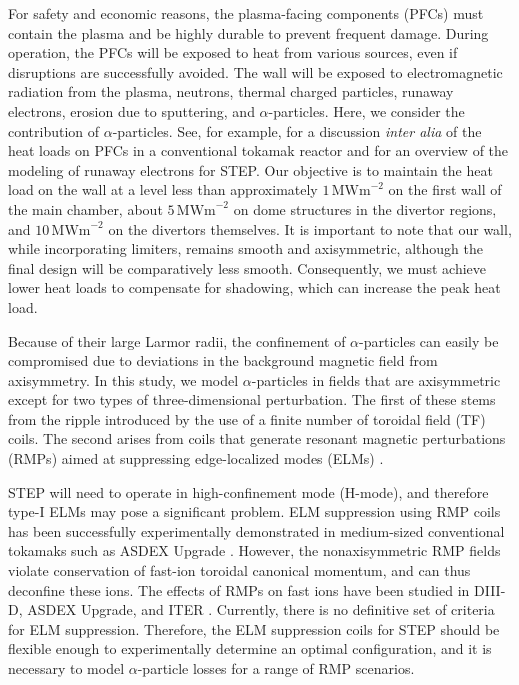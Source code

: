 \documentclass[10pt, a4paper, twoside]{article}
\begin{document}
For safety and economic reasons, the plasma-facing components (PFCs) must contain the plasma and be highly durable to prevent frequent damage. During operation, the PFCs will be exposed to heat from various sources, even if disruptions are successfully avoided. The wall will be exposed to electromagnetic radiation from the plasma, neutrons, thermal charged particles, runaway electrons, erosion due to sputtering, and $\alpha$-particles. Here, we consider the contribution of $\alpha$-particles. See, for example, \cite{bachmann2018} for a discussion {\it inter alia} of the heat loads on PFCs in a conventional tokamak reactor and \cite{fil2023} for an overview of the modeling of runaway electrons for STEP. Our objective is to maintain the heat load on the wall at a level less than approximately $1\, \text{MWm}^{-2}$ on the first wall of the main chamber, about $5\, \text{MWm}^{-2}$ on dome structures in the divertor regions, and $10\, \text{MWm}^{-2}$ on the divertors themselves. It is important to note that our wall, while incorporating limiters, remains smooth and axisymmetric, although the final design will be comparatively less smooth. Consequently, we must achieve lower heat loads to compensate for shadowing, which can increase the peak heat load.

Because of their large Larmor radii, the confinement of $\alpha$-particles can easily be compromised due to deviations in the background magnetic field from axisymmetry.  In this study, we model $\alpha$-particles in fields that are axisymmetric except for two types of three-dimensional perturbation. The first of these stems from the ripple introduced by the use of a finite number of toroidal field (TF) coils. The second arises from coils that generate resonant magnetic perturbations (RMPs) aimed at suppressing edge-localized modes (ELMs) \cite{zohm1996}.

STEP will need to operate in high-confinement mode (H-mode), and therefore type-I ELMs may pose a significant problem. ELM suppression using RMP coils has been successfully experimentally demonstrated in medium-sized conventional tokamaks such as ASDEX Upgrade \cite{suttrop2018}. However, the nonaxisymmetric RMP fields violate conservation of fast-ion toroidal canonical momentum, and can thus deconfine these ions. The effects of RMPs on fast ions have been studied in DIII-D, ASDEX Upgrade, and ITER \cite{van2015,sanchis2018,ward2022}. Currently, there is no definitive set of criteria for ELM suppression. Therefore, the ELM suppression coils for STEP should be flexible enough to experimentally determine an optimal configuration, and it is necessary to model $\alpha$-particle losses for a range of RMP scenarios.
\end{document}
